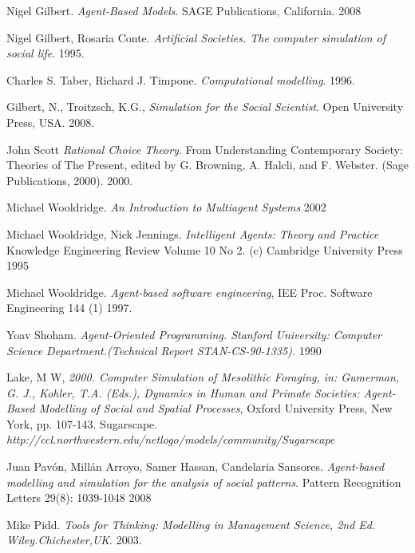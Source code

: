 \documentclass[11pt,oneside,a4paper,openright]{report}
\begin{document}
\begin{thebibliography}{50}
	Nigel Gilbert.
	\emph{Agent-Based Models}. SAGE Publications, California.
	2008

	Nigel Gilbert, Rosaria Conte.
	\emph{Artificial Societies. The computer simulation of social life}.
	1995.

	Charles S. Taber, Richard J. Timpone.
	\emph{Computational modelling}.
	1996.

	Gilbert, N., Troitzsch, K.G.,
	\emph{Simulation for the Social Scientist}. Open University Press, USA.
	2008.

	John Scott
	\emph{Rational Choice Theory}. From Understanding Contemporary Society: Theories of The Present, edited by G. Browning,
	A. Halcli, and F. Webster. (Sage Publications, 2000).
	2000.

	Michael Wooldridge.
	\emph{An Introduction to Multiagent Systems}
	2002

	 Michael Wooldridge, Nick Jennings.
	\emph{Intelligent Agents: Theory and Practice}  Knowledge Engineering Review Volume 10 No 2. (c) Cambridge
	University Press 
	1995

	 Michael Wooldridge.
	\emph{Agent-based software engineering}, IEE Proc. Software Engineering 144 (1) 
	1997.

	Yoav Shoham.
	\emph{Agent-Oriented Programming. Stanford University: Computer Science Department.(Technical Report STAN-CS-90-1335).}
	1990 

	Lake, M W,
	\emph{2000. Computer Simulation of Mesolithic Foraging, in: Gumerman, G. J., Kohler, T.A. (Eds.), Dynamics in Human and Primate Societies: Agent-Based Modelling of Social and Spatial Processes}, Oxford University Press, New York, pp. 107-143.
	Sugarscape.
	\emph{http://ccl.northwestern.edu/netlogo/models/community/Sugarscape}

	Juan Pavón, Millán Arroyo, Samer Hassan, Candelaria Sansores.
	\emph{Agent-based modelling and simulation for the analysis of social patterns}. Pattern Recognition Letters 29(8): 1039-1048 
	2008

	Mike Pidd.
	\emph{Tools for Thinking: Modelling in Management Science, 2nd Ed. Wiley.Chichester,UK}.
	2003.


\end{thebibliography}
\end{document}
